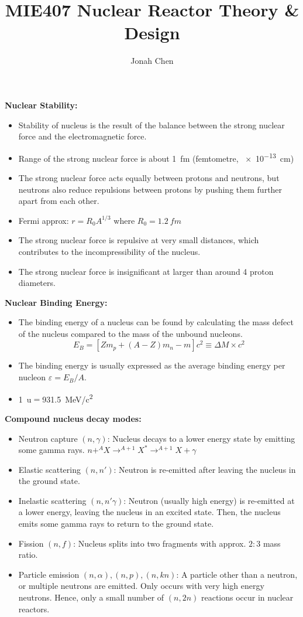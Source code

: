 \documentclass[a4paper]{article}
\title{MIE407 Nuclear Reactor Theory \& Design}
\author{Jonah Chen}
\date{}
\begin{document}
\maketitle
\sffamily
\textbf{Nuclear Stability:}
\begin{itemize}
    \item Stability of nucleus is the result of the balance between the strong nuclear force and the electromagnetic force.
    \item Range of the strong nuclear force is about \SI{1}{fm} (femtometre, \SI{e-13}{cm})
    \item The strong nuclear force acts equally between protons and neutrons, but neutrons also reduce repulsions between protons by pushing them further apart from each other.
    \item Fermi approx: $r = R_0 A^{1/3}$ where $R_0 = \SI{1.2}{fm}$
    \item The strong nuclear force is repulsive at very small distances, which contributes to the incompressibility of the nucleus.
    \item The strong nuclear force is insignificant at larger than around 4 proton diameters.
\end{itemize}
\textbf{Nuclear Binding Energy:}
\begin{itemize}
    \item The binding energy of a nucleus can be found by calculating the mass defect of the nucleus compared to the mass of the unbound nucleons.
    \begin{equation}
        E_B=[Zm_p + (A-Z)m_n - m] c^2\equiv \Delta M\times c^2
    \end{equation}
    \item The binding energy is usually expressed as the average binding energy per nucleon $\varepsilon = E_B/A$.
    \item \SI{1}{u}$=$\SI{931.5}{MeV/c^2}
\end{itemize}
\textbf{Compound nucleus decay modes:}
\begin{itemize}
    \item Neutron capture $(n,\gamma)$: Nucleus decays to a lower energy state by emitting some gamma rays. $n+ ^AX\to ^{A+1}X^*\to ^{A+1}X+\gamma$
    \item Elastic scattering $(n,n')$: Neutron is re-emitted after leaving the nucleus in the ground state.
    \item Inelastic scattering $(n,n'\gamma)$: Neutron (usually high energy) is re-emitted at a lower energy, leaving the nucleus in an excited state. Then, the nucleus emits some gamma rays to return to the ground state.
    \item Fission $(n,f)$: Nucleus splits into two fragments with approx. $2:3$ mass ratio.
    \item Particle emission $(n,\alpha),(n,p),(n,kn)$: A particle other than a neutron, or multiple neutrons are emitted. Only occurs with very high energy neutrons. Hence, only a small number of $(n,2n)$ reactions occur in nuclear reactors.
\end{itemize}
\end{document}
